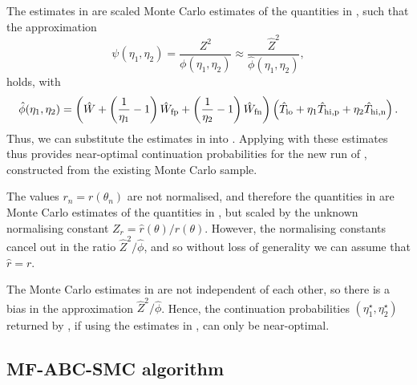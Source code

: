 \documentclass[review]{siamonline190516}
\begin{document}
The estimates in  are scaled Monte Carlo estimates of the quantities in , such that the approximation
\[
\psi(\eta_1,\eta_2) = \frac{Z^2}{\phi(\eta_1,\eta_2)} \approx \frac{\hat Z^2}{\hat \phi(\eta_1,\eta_2)},
\]
holds, with
\begin{equation}
\label{eq:PhiHat}
\hat \phi(\eta_1, \eta_2) = 
\left(  \hat W + \left( \frac{1}{\eta_1} - 1 \right) \fp{\hat W} + \left( \frac{1}{\eta_2} - 1 \right) \fn{\hat W} \right)
\left( \hat{T}_{\mathrm{lo}}
 + \eta_1 \hat T_{\mathrm{hi}, \mathrm p}
 + \eta_2 \hat T_{\mathrm{hi}, \mathrm n} \right).
\end{equation}
Thus, we can substitute the estimates in  into .
Applying  with these estimates thus provides near-optimal continuation probabilities for the new run of , constructed from the existing Monte Carlo sample.

\begin{note}
The values $r_n = r(\theta_n)$ are not normalised, and therefore the quantities in  are Monte Carlo estimates of the quantities in , but scaled by the unknown normalising constant $Z_r = \hat r(\theta)/r(\theta)$.
However, the normalising constants cancel out in the ratio $\hat Z^2/\hat \phi$, and so without loss of generality we can assume that $\hat r = r$.
\end{note}

\begin{note}
The Monte Carlo estimates in  are not independent of each other, so there is a bias in the approximation $\hat Z^2 / \hat \phi$.
Hence, the continuation probabilities $(\eta_1^\star, \eta_2^\star)$ returned by , if using the estimates in , can only be near-optimal. 
\end{note}


\subsection{MF-ABC-SMC algorithm}
\label{s:MFABC:SMC}
\end{document}
